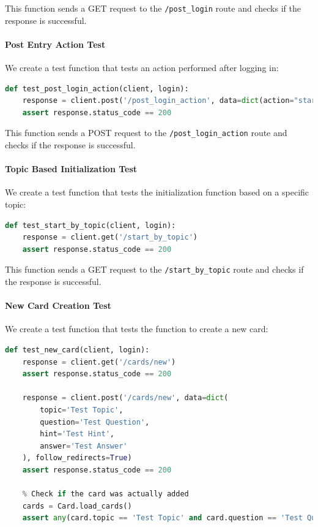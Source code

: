This function sends a GET request to the \texttt{/post\_login} route and checks if the response is successful.

\paragraph{Post Entry Action Test}
We create a test function that tests an action performed after logging in:

\begin{lstlisting}[language=Python]
def test_post_login_action(client, login):
    response = client.post('/post_login_action', data=dict(action="start_game"), follow_redirects=True)
    assert response.status_code == 200
\end{lstlisting}

This function sends a POST request to the \texttt{/post\_login\_action} route and checks if the response is successful.\newpage

\paragraph{Topic Based Initialization Test}
We create a test function that tests the initialization function based on a specific topic:

\begin{lstlisting}[language=Python]
def test_start_by_topic(client, login):
    response = client.get('/start_by_topic')
    assert response.status_code == 200
\end{lstlisting}

This function sends a GET request to the \texttt{/start\_by\_topic} route and checks if the response is successful.

\paragraph{New Card Creation Test}
We create a test function that tests the function to create a new card:

\begin{lstlisting}[language=Python]
def test_new_card(client, login):
    response = client.get('/cards/new')
    assert response.status_code == 200

    response = client.post('/cards/new', data=dict(
        topic='Test Topic',
        question='Test Question',
        hint='Test Hint',
        answer='Test Answer'
    ), follow_redirects=True)
    assert response.status_code == 200

    % Check if the card was actually added
    cards = Card.load_cards()
    assert any(card.topic == 'Test Topic' and card.question == 'Test Question' for card in cards)
\end{lstlisting}

